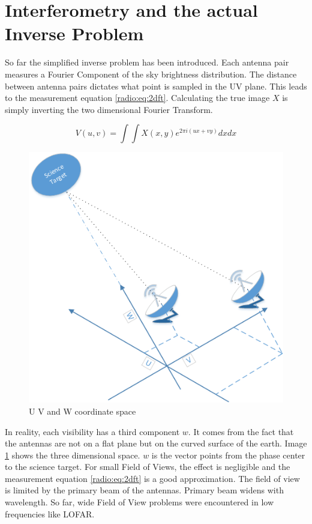 \section{Interferometry and the actual Inverse Problem} \label{radio}
So far the simplified inverse problem has been introduced. Each antenna pair measures a Fourier Component of the sky brightness distribution. The distance between antenna pairs dictates what point is sampled in the UV plane. This leads to the measurement equation \eqref{radio:eq:2dft}. Calculating the true image $X$ is simply inverting the two dimensional Fourier Transform.

\begin{equation}\label{radio:eq:2dft}
V(u, v) = \int\int X(x, y) e^{2 \pi i (ux+vy)} dx dx
\end{equation}

\begin{figure}
	\vspace{-15pt}
	\centering
	\includegraphics[width=0.9\linewidth]{./chapters/03.radio/uvw.png}
	\caption{U V and W coordinate space}
	\label{radio:uvw}
	\vspace{-10pt}
\end{figure}

In reality, each visibility has a third component $w$. It comes from the fact that the antennas are not on a flat plane but on the curved surface of the earth. Image \ref{radio:uvw} shows the three dimensional space. $w$ is the vector points from the phase center to the science target. For small Field of Views, the effect is negligible and the measurement equation \eqref{radio:eq:2dft} is a good approximation. The field of view is limited by the primary beam of the antennas. Primary beam widens with wavelength. So far, wide Field of View problems were encountered in low frequencies like LOFAR.


